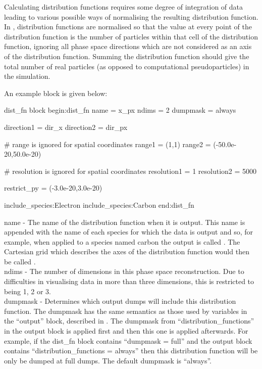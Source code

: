 Calculating distribution functions requires some degree of integration of data
leading to various possible ways of normalising the resulting distribution
function. In {\EPOCH}, distribution functions are normalised so that the value
at every point of the distribution function is the number of particles within
that cell of the distribution function, ignoring all phase space directions
which are not considered as an axis of the distribution function. Summing the
distribution function should give the total number of real particles
(as opposed to computational pseudoparticles) in the
simulation.

An example  block is given below:
{\samepage
\begin{lboxverbatim}{dist\_fn block}
begin:dist_fn
   name = x_px
   ndims = 2
   dumpmask = always

   direction1 = dir_x
   direction2 = dir_px

   # range is ignored for spatial coordinates
   range1 = (1,1)
   range2 = (-50.0e-20,50.0e-20)

   # resolution is ignored for spatial coordinates
   resolution1 = 1
   resolution2 = 5000

   restrict_py = (-3.0e-20,3.0e-20)

   include_species:Electron
   include_species:Carbon
end:dist_fn
\end{lboxverbatim}
}

{\emphtext name} - The name of the distribution function when it is
output. This name is appended with the name of each species for which the data
is output and so, for example, when applied to a species named
carbon the output is called . The Cartesian grid
which describes the axes of the distribution function would then be called
.\\

{\emphtext ndims} - The number of dimensions in this phase space
reconstruction. Due to difficulties in visualising data in more than three
dimensions, this is restricted to being 1, 2 or 3.\\

{\emphtext dumpmask} - Determines which output dumps will include this
distribution function. The dumpmask has the same semantics as those used
by variables in the ``output'' block, described in .
The dumpmask from ``distribution\_functions'' in the output block is applied
first and then this one is applied afterwards. For example, if the
dist\_fn block contains ``dumpmask = full'' and the output block contains
``distribution\_functions = always'' then this distribution function will be
only be dumped at full dumps. The default dumpmask is ``always''.\\

